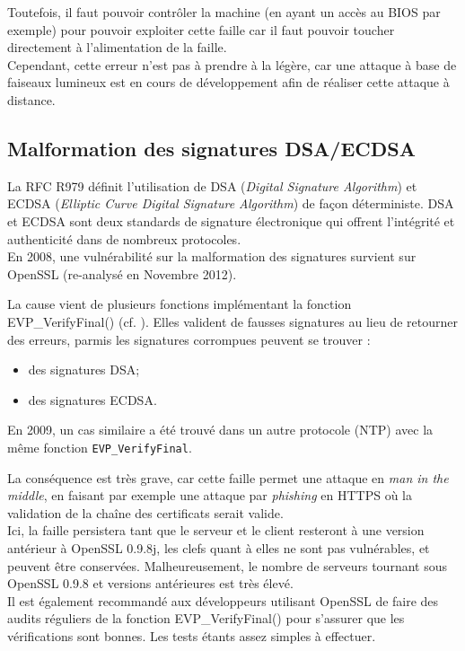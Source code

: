 			Toutefois, il faut pouvoir contrôler la machine (en ayant un accès au BIOS par exemple) pour pouvoir exploiter cette faille car il faut pouvoir toucher directement à l'alimentation de la faille.\\

			Cependant, cette erreur n'est pas à prendre à la légère, car une attaque à base de faiseaux lumineux est en cours de développement afin de réaliser cette attaque à distance.
			
\subsection{Malformation des signatures DSA/ECDSA}
La RFC R979 définit l'utilisation de DSA (\textit{Digital Signature Algorithm}) et ECDSA (\textit{Elliptic Curve Digital Signature Algorithm}) de façon déterministe. DSA et ECDSA sont deux standards de signature électronique qui offrent l'intégrité et authenticité dans de nombreux protocoles.\\

En 2008, une vulnérabilité sur la malformation des signatures survient sur OpenSSL (re-analysé en Novembre 2012). 

		La cause vient de plusieurs fonctions implémentant la fonction EVP\_VerifyFinal() (cf. \textit{}). Elles valident de fausses signatures au lieu de retourner des erreurs, parmis les signatures corrompues peuvent se trouver :
		\begin{itemize}
		\item des signatures DSA;
		\item des signatures ECDSA.\\
		\end{itemize}

		En 2009, un cas similaire a été trouvé dans un autre protocole (NTP) avec la même fonction \texttt{EVP\_VerifyFinal}.

		La conséquence est très grave, car cette faille permet une attaque en \textit{man in the middle}, en faisant par exemple une attaque par \textit{phishing} en HTTPS où la validation de la chaîne des certificats serait valide.\\
		
		Ici, la faille persistera tant que le serveur et le client resteront à une version antérieur à OpenSSL 0.9.8j, les clefs quant à elles ne sont pas vulnérables, et peuvent être conservées. Malheureusement, le nombre de serveurs tournant sous OpenSSL 0.9.8 et versions antérieures est très élevé.\\

			Il est également recommandé aux développeurs utilisant OpenSSL de faire des audits réguliers de la fonction EVP\_VerifyFinal() pour s'assurer que les vérifications sont bonnes. Les tests étants assez simples à effectuer.


